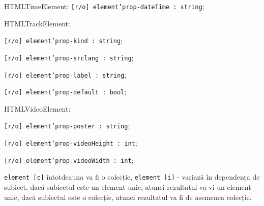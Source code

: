 \begin{icItems}
	\item HTMLTimeElement: \texttt{[r/o] element'prop-dateTime : string};
	
	\item HTMLTrackElement:
	\begin{icItems}
		\item \texttt{[r/o] element'prop-kind : string};
		\item \texttt{[r/o] element'prop-srclang : string};
		\item \texttt{[r/o] element'prop-label : string};
		\item \texttt{[r/o] element'prop-default : bool};
	\end{icItems}
	
	\item HTMLVideoElement:
	\begin{icItems}
		\item \texttt{[r/o] element'prop-poster : string};
		\item \texttt{[r/o] element'prop-videoHeight : int};
		\item \texttt{[r/o] element'prop-videoWidth : int};
	\end{icItems}
	
\end{icItems}

\texttt{element [c]} întotdeauna va fi o colecție, \texttt{element [i]} - variază în dependența de subiect, dacă subiectul este un element unic, atunci rezultatul va vi un element unic, dacă subiectul este o colecție, atunci rezultatul va fi de asemenea colecție. 

